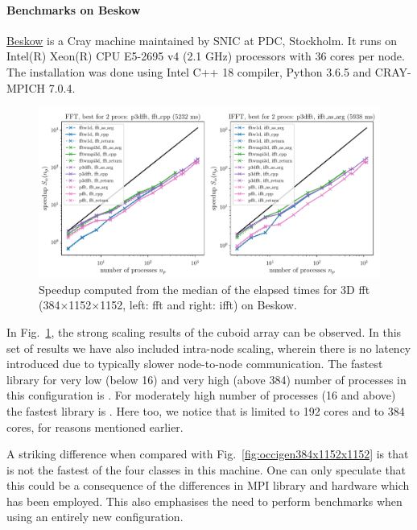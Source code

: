 \paragraph{Benchmarks on Beskow}

\href{ https://www.pdc.kth.se/hpc-services/computing-systems}{Beskow} is a Cray
machine maintained by SNIC at PDC, Stockholm. It runs on Intel(R) Xeon(R) CPU
E5-2695 v4 (2.1 GHz) processors with 36 cores per node. The installation was
done using Intel C++ 18 compiler, Python 3.6.5 and CRAY-MPICH 7.0.4.

\begin{figure}[htp!]
\centering
\includegraphics[width=\linewidth]{tmp/fig_beskow_384x1152x1152}
\caption{Speedup computed from the median of the elapsed times for 3D fft
(384$\times$1152$\times$1152, left: fft and right: ifft) on Beskow.}
\label{fig:beskow384x1152x1152}
\end{figure}

In Fig.~\ref{fig:beskow384x1152x1152}, the strong scaling results of the cuboid
array can be observed. In this set of results we have also included intra-node
scaling, wherein there is no latency introduced due to typically slower
node-to-node communication. The fastest library for very low (below 16) and
very high (above 384) number of processes in this configuration is
. For moderately high number of processes (16 and above) the
fastest library is . Here too, we notice that
 is limited to 192 cores and  to 384
cores, for reasons mentioned earlier.

A striking difference when compared with Fig.~\ref{fig:occigen384x1152x1152} is
that  is not the fastest of the four classes in this machine.
One can only speculate that this could be a consequence of the differences in MPI
library and hardware which has been employed. This also emphasises the need to
perform benchmarks when using an entirely new configuration.

